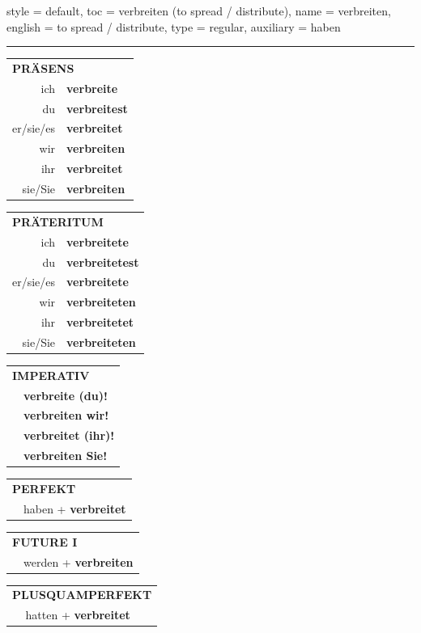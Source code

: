 \begin{verbentry}{
  style = {default},
  toc = {verbreiten (to spread / distribute)},
  name = {verbreiten},
  english = {to spread / distribute},
  type = {regular},
  auxiliary = {haben}
}


\vspace{5pt}
\hrule
\vspace{5pt}

\begin{tabular}{rl}
\multicolumn{2}{l}{\textbf{PRÄSENS}}\\
ich & \textbf{verbreite}\\
du & \textbf{verbreitest}\\
er/sie/es & \textbf{verbreitet}\\
wir & \textbf{verbreiten}\\
ihr & \textbf{verbreitet}\\
sie/Sie & \textbf{verbreiten}\\
\end{tabular}
\hfill
\begin{tabular}{rl}
\multicolumn{2}{l}{\textbf{PRÄTERITUM}}\\
ich & \textbf{verbreitete}\\
du & \textbf{verbreitetest}\\
er/sie/es & \textbf{verbreitete}\\
wir & \textbf{verbreiteten}\\
ihr & \textbf{verbreitetet}\\
sie/Sie & \textbf{verbreiteten}\\
\end{tabular}
\hfill
\begin{tabular}{rl}
\multicolumn{2}{l}{\textbf{IMPERATIV}}\\
& \textbf{verbreite (du)!}\\
& \textbf{verbreiten wir!}\\
& \textbf{verbreitet (ihr)!}\\
& \textbf{verbreiten Sie!}\\
\end{tabular}

\vspace{10pt}

\begin{tabular}{rl}
\multicolumn{2}{l}{\textbf{PERFEKT}}\\
& haben + \textbf{verbreitet}\\
\end{tabular}
\hfill
\begin{tabular}{rl}
\multicolumn{2}{l}{\textbf{FUTURE I}}\\
& werden + \textbf{verbreiten}\\
\end{tabular}
\hfill
\begin{tabular}{rl}
\multicolumn{2}{l}{\textbf{PLUSQUAMPERFEKT}}\\
& hatten + \textbf{verbreitet}\\
\end{tabular}


\end{verbentry}
